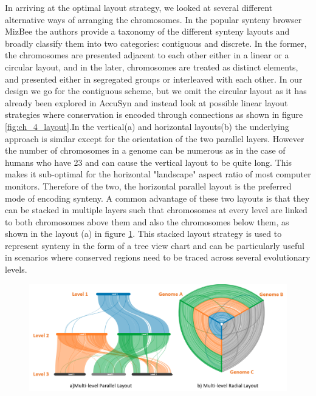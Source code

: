 In arriving at the optimal layout strategy, we looked at several different alternative ways of arranging the chromosomes. In the popular synteny browser MizBee\cite{Meyer2009} the authors provide a taxonomy of the different synteny layouts and broadly classify them into two categories: contiguous and discrete. In the former, the chromosomes are presented adjacent to each other either in a linear or a circular layout, and in the later, chromosomes are treated as distinct elements, and presented either in segregated groups or interleaved with each other. In our design we go for the contiguous scheme, but we omit the circular layout as it has already been explored in AccuSyn\cite{accusyn}  and instead look at possible linear layout strategies where conservation is encoded through connections as shown in figure \ref{fig:ch_4_layout}.In the vertical(a) and horizontal layouts(b) the underlying approach is similar except for the orientation of the two parallel layers. However the number of chromosomes in a genome can be numerous as in the case of humans who have 23 and can cause the vertical layout to be quite long. This makes it sub-optimal for the horizontal "landscape" aspect ratio of most computer monitors. Therefore of the two, the horizontal parallel layout is the preferred mode of encoding synteny. A common advantage of these two layouts is that they can be stacked in multiple layers such that chromosomes at every level are linked to both chromosomes above them and also the chromosomes below them, as shown in the layout (a) in figure \ref{fig:ch_4_layout_multi}. This stacked layout strategy is used to represent synteny in the form of a tree view chart and can be particularly useful in scenarios where conserved regions need to be traced across several evolutionary levels.

\begin{figure}[ht]
  \centering
  \includegraphics[width=.95\linewidth]{images/ch_4_layout_multi.PNG}
  \label{fig:ch_4_layout_multi}
\end{figure}

